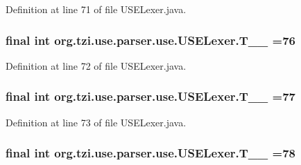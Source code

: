 Definition at line 71 of file U\-S\-E\-Lexer.\-java.

\hypertarget{classorg_1_1tzi_1_1use_1_1parser_1_1use_1_1_u_s_e_lexer_affe730f610a1d04cddc967d35dd149c0}{
\subsubsection[{T\-\_\-\-\_\-76}]{\setlength{\rightskip}{0pt plus 5cm}final int org.\-tzi.\-use.\-parser.\-use.\-U\-S\-E\-Lexer.\-T\-\_\-\-\_ =76\hspace{0.3cm}{\ttfamily [static]}}}\label{classorg_1_1tzi_1_1use_1_1parser_1_1use_1_1_u_s_e_lexer_affe730f610a1d04cddc967d35dd149c0}


Definition at line 72 of file U\-S\-E\-Lexer.\-java.

\hypertarget{classorg_1_1tzi_1_1use_1_1parser_1_1use_1_1_u_s_e_lexer_ab4f34a46204c6b342f00e513e1080617}{
\subsubsection[{T\-\_\-\-\_\-77}]{\setlength{\rightskip}{0pt plus 5cm}final int org.\-tzi.\-use.\-parser.\-use.\-U\-S\-E\-Lexer.\-T\-\_\-\-\_ =77\hspace{0.3cm}{\ttfamily [static]}}}\label{classorg_1_1tzi_1_1use_1_1parser_1_1use_1_1_u_s_e_lexer_ab4f34a46204c6b342f00e513e1080617}


Definition at line 73 of file U\-S\-E\-Lexer.\-java.

\hypertarget{classorg_1_1tzi_1_1use_1_1parser_1_1use_1_1_u_s_e_lexer_a99f0d5648b01fdb62d0f0bf7d35cf57d}{
\subsubsection[{T\-\_\-\-\_\-78}]{\setlength{\rightskip}{0pt plus 5cm}final int org.\-tzi.\-use.\-parser.\-use.\-U\-S\-E\-Lexer.\-T\-\_\-\-\_ =78\hspace{0.3cm}{\ttfamily [static]}}}\label{classorg_1_1tzi_1_1use_1_1parser_1_1use_1_1_u_s_e_lexer_a99f0d5648b01fdb62d0f0bf7d35cf57d}



